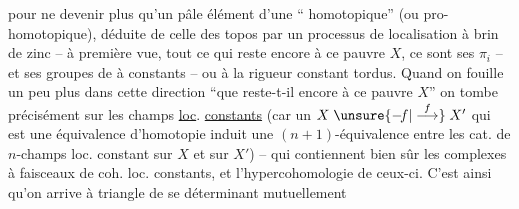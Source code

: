 pour ne devenir plus qu'un pâle élément d'une `` homotopique'' (ou pro-homotopique), déduite de celle des topos par un processus de localisation à brin de zinc -- à première vue, tout ce qui reste encore à ce pauvre $X$, ce sont ses $\pi_i$ -- et ses groupes de  à  constants -- ou à la rigueur constant tordus. Quand on fouille un peu plus dans cette direction ``que reste-t-il encore à ce pauvre $X$'' on tombe précisément sur les champs \uline{loc}. \uline{constants} (car un $X\mathrel{\unsure{\relbar\mkern-8mu f|\overset{f}{\longrightarrow}}}X'$ qui est une équivalence d'homotopie induit une $(n+1)$-équivalence entre les cat. de $n$-champs loc. constant sur $X$ et sur $X'$) -- qui contiennent bien sûr les complexes    à faisceaux de coh. loc. constants, et l'hypercohomologie de ceux-ci. C'est ainsi qu'on arrive à   triangle de  se déterminant mutuellement

